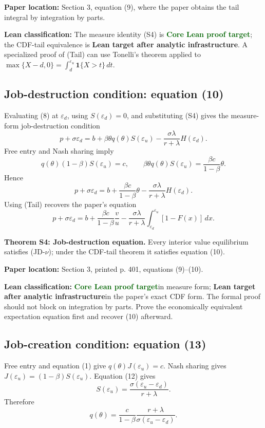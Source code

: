 \documentclass[11pt]{article}
\newcommand{\epsd}{\varepsilon_d}
\newcommand{\epsu}{\varepsilon_u}
\newcommand{\paperloc}[1]{\textbf{Paper location:} #1}
\newcommand{\leanclass}[1]{\textbf{Lean classification:} #1}
\newcommand{\core}{\textcolor{darkGreen}{\textbf{Core Lean proof target}}}
\newcommand{\infra}{\textcolor{darkAmber}{\textbf{Lean target after analytic infrastructure}}}
\newcommand{\resultname}[1]{\medskip\noindent\textbf{#1.}}
\begin{document}
\paperloc{Section 3, equation (9), where the paper obtains the tail integral by integration by parts.}

\leanclass{The measure identity (S4) is \core; the CDF-tail equivalence is \infra.}
A specialized proof of (Tail) can use Tonelli's theorem applied to
$\max\{X-d,0\}=\int_d^{\epsu}\mathbf{1}\{X>t\}\,dt$.

\subsection{Job-destruction condition: equation (10)}

Evaluating (8) at $\epsd$, using $S(\epsd)=0$, and substituting (S4) gives the measure-form job-destruction condition
\begin{equation}
 p+\sigma\epsd
 =b+\beta\theta q(\theta)S(\epsu)
 -\frac{\sigma\lambda}{r+\lambda}H(\epsd). \tag{JD-raw}
\end{equation}
Free entry and Nash sharing imply
\[
 q(\theta)(1-\beta)S(\epsu)=c,
 \qquad
 \beta\theta q(\theta)S(\epsu)
 =\frac{\beta c}{1-\beta}\theta.
\]
Hence
\begin{equation}
 p+\sigma\epsd
 =b+\frac{\beta c}{1-\beta}\theta
 -\frac{\sigma\lambda}{r+\lambda}H(\epsd). \tag{JD-$\nu$}
\end{equation}
Using (Tail) recovers the paper's equation
\begin{equation}
 p+\sigma\epsd
 =b+\frac{\beta c}{1-\beta}\frac vu
 -\frac{\sigma\lambda}{r+\lambda}
 \int_{\epsd}^{\epsu}[1-F(x)]\,dx. \tag{10}
\end{equation}

\resultname{Theorem S4: Job-destruction equation}
Every interior value equilibrium satisfies (JD-$\nu$); under the CDF-tail theorem it satisfies equation (10).

\paperloc{Section 3, printed p. 401, equations (9)--(10).}

\leanclass{\core in measure form; \infra in the paper's exact CDF form.}
The formal proof should not block on integration by parts. Prove the economically equivalent expectation equation first and recover (10) afterward.

\subsection{Job-creation condition: equation (13)}

Free entry and equation (1) give $q(\theta)J(\epsu)=c$. Nash sharing gives $J(\epsu)=(1-\beta)S(\epsu)$. Equation (12) gives
\[
 S(\epsu)=\frac{\sigma(\epsu-\epsd)}{r+\lambda}.
\]
Therefore
\begin{equation}
 q(\theta)=\frac{c}{1-\beta}
 \frac{r+\lambda}{\sigma(\epsu-\epsd)}. \tag{13}
\end{equation}
\end{document}
